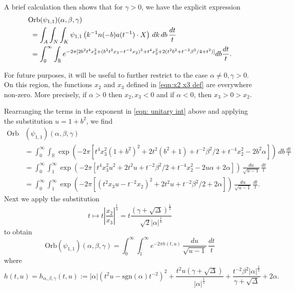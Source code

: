 \documentclass[reqno, 11pt]{amsart} %
\numberwithin{equation}{section}
\theoremstyle{plain}
\theoremstyle{definition}
\theoremstyle{remark}
\newcommand{\Orb}{\mathrm{Orb}}
\begin{document}
A brief calculation then shows that for $\gamma>0$, we have the explicit expression
\begin{align}
&\Orb(\psi_{1,1})(\alpha,\beta,\gamma) \notag \\
& \ = \int_{A} \int_{N} \int_K \psi_{1,1} \left(  k^{-1} n(-b) a(t^{-1}) \cdot X \right) \, dk \,  db \, \frac{dt}{t}  \notag \\
&\ = \int_0^{\infty} \int_{\mathbb R} 		 e^{ -2\pi [ 2 b^2 t^4 x_3^2 + (b^2 t^2 x_3 -t^{-2} x_2)^2  + t^4 x_3^2 + 2( t^2 b^2 + t^{-2} \beta^2/4 + t^2) ] }  db  \frac{dt}t  . \label{eqn: unitary int}
\end{align}



For future purposes, it will be  useful to further restrict to the case $\alpha \neq 0, \gamma >0$.
On this region, the functions $x_2$ and $x_3$ defined in \eqref{eqn:x2 x3 def} are everywhere non-zero. More precisely, if $\alpha>0$ then $x_2, x_3 <0$ and if $\alpha <0$, then $x_3> 0 > x_2$.

Rearranging the terms in the exponent in \eqref{eqn: unitary int} above and applying the substitution $u = 1+b^2$, we find
\begin{align*}
\Orb&(\psi_{1,1})(\alpha,\beta,\gamma)   \\
&= \int_0^{\infty} \int_{\mathbb R} 		 \exp \left(-2\pi [  t^4 x_3^2( 1+ b^2)^2 + 2 t^2(b^2 + 1)   + t^{-2}\beta^2 / 2 + t^{-4} x_2^2 -2 b^2 \alpha ] \right)  \, db \, \frac{dt}t  \\
&=     \int_0^{\infty} \int_{1}^{\infty} 		 \exp \left(-2\pi [  t^4 x_3^2 u^2 + 2 t^2u   + t^{-2}\beta^2 / 2 + t^{-4} x_2^2 -2 u \alpha + 2 \alpha ] \right)  \,\frac{du}{\sqrt{u-1}}\, \frac{dt}t  \\
&=   \int_0^{\infty} \int_{1}^{\infty} 		 \exp \left(-2\pi [ ( t^2 x_3 u -t^{-2} x_2)^2 + 2 t^2u   + t^{-2}\beta^2 / 2   + 2 \alpha ] \right)  \,\frac{du}{\sqrt{u-1}}\, \frac{dt}t  .
\end{align*}
Next we apply the substitution
\[ t \mapsto t \left| \frac{x_2}{x_3} \right|^{\frac14} = t \frac{(\gamma + \sqrt{\Delta})^{\frac12}}{\sqrt 2|\alpha|^{\frac14}} \]
to obtain
\begin{equation}
\Orb(\psi_{1,1})(\alpha,\beta,\gamma) =     \int_0^{\infty} \int_{1}^{\infty} e^{- 2 \pi h(t,u)}  \,\frac{du}{\sqrt{u-1}}\, \frac{dt}t \label{eqn:unitary orb int again}
\end{equation}
where
\begin{equation} \label{eqn:U11 orb int exponent}
h(t,u) = h_{\alpha,\beta,\gamma}(t,u) :=  |\alpha|( t^2  u - \mathrm{sgn}(\alpha)t^{-2} )^2 + \frac{t^2u(\gamma+ \sqrt{\Delta})}{|\alpha|^\frac12}   + \frac{t^{-2} \beta^2 |\alpha|^{\frac12}}{\gamma+ \sqrt{\Delta}}   + 2 \alpha.
\end{equation}
\end{document}
